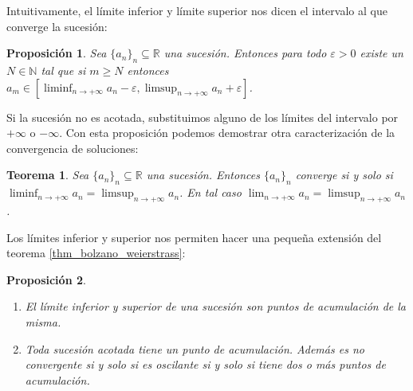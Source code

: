 \documentclass{article}
\newtheorem{theorem}{Teorema}
\newtheorem{prop}{Proposición}
\newcommand{\reales}{\mathbb{R}}
\newcommand{\naturales}{\mathbb{N}}
\newcommand{\sucesion}[1]{\{ #1 _n \}_n}
\newcommand{\sucreal}[1]{\{ #1 _n \}_n \subseteq \reales}
\newcommand{\limitesup}[1]{\limsup_{n\rightarrow +\infty} #1 _n}
\newcommand{\limiteinf}[1]{\liminf_{n\rightarrow +\infty} #1 _n}
\newcommand{\limiten}[1]{\lim_{n \rightarrow +\infty} #1}
\begin{document}
Intuitivamente, el límite inferior y límite superior nos dicen el intervalo al que converge la sucesión:

\begin{prop}
	Sea $\sucreal{a}$ una sucesión. Entonces para todo $\varepsilon > 0$ existe un $N \in \naturales$ tal que si $m \geq N$ entonces $a_m \in [\limiteinf{a}-\varepsilon, \limitesup{a}+\varepsilon]$.
\end{prop}

Si la sucesión no es acotada, substituimos alguno de los límites del intervalo por $+\infty$ o $-\infty$.
Con esta proposición podemos demostrar otra caracterización de la convergencia de soluciones:

\begin{theorem}
	Sea $\sucreal{a}$ una sucesión. Entonces $\sucesion{a}$ converge si y solo si $\limiteinf{a} = \limitesup{a}$. En tal caso $\limiten{a_n} = \limitesup{a}$.
\end{theorem}

Los límites inferior y superior nos permiten hacer una pequeña extensión del teorema \eqref{thm_bolzano_weierstrass}:
\begin{prop}
\begin{enumerate}
\item
	El límite inferior y superior de una sucesión son puntos de acumulación de la misma.
\item
	Toda sucesión acotada tiene un punto de acumulación. Además es no convergente si y solo si es oscilante si y solo si tiene dos o más puntos de acumulación.
\end{enumerate}
\end{prop}
\end{document}

